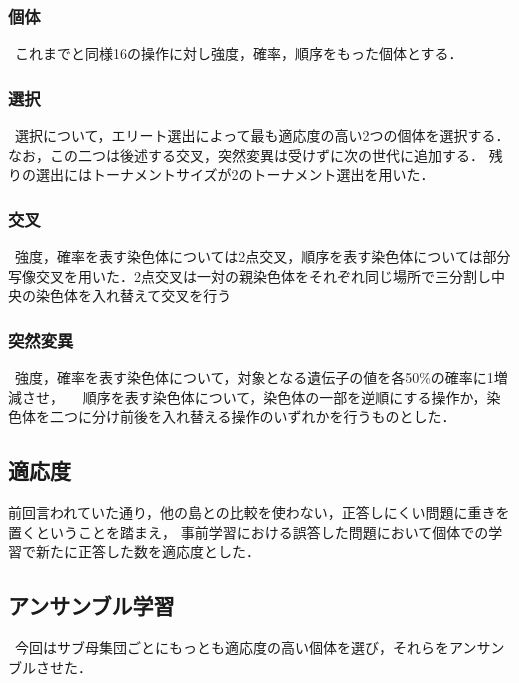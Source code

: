 \documentclass[twocolumn]{jarticle}     %
\begin{document}
\subsubsection{個体}
\ これまでと同様16の操作に対し強度，確率，順序をもった個体とする．

\subsubsection{選択}
\ 選択について，エリート選出によって最も適応度の高い2つの個体を選択する．なお，この二つは後述する交叉，突然変異は受けずに次の世代に追加する．
残りの選出にはトーナメントサイズが2のトーナメント選出を用いた．
　
\subsubsection{交叉}
\ 強度，確率を表す染色体については2点交叉，順序を表す染色体については部分写像交叉を用いた．2点交叉は一対の親染色体をそれぞれ同じ場所で三分割し中央の染色体を入れ替えて交叉を行う
　
\subsubsection{突然変異}
\ 強度，確率を表す染色体について，対象となる遺伝子の値を各50\%の確率に1増減させ，
　順序を表す染色体について，染色体の一部を逆順にする操作か，染色体を二つに分け前後を入れ替える操作のいずれかを行うものとした．
\subsection{適応度}
前回言われていた通り，他の島との比較を使わない，正答しにくい問題に重きを置くということを踏まえ，
事前学習における誤答した問題において個体での学習で新たに正答した数を適応度とした．

\subsection{アンサンブル学習}
\ 今回はサブ母集団ごとにもっとも適応度の高い個体を選び，それらをアンサンブルさせた．
\end{document}
